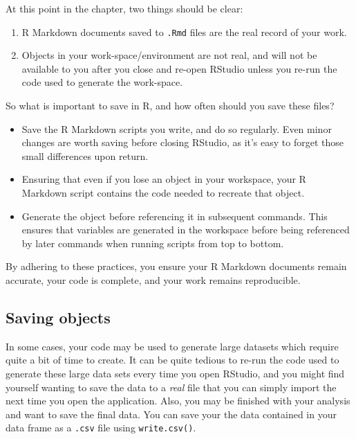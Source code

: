 \documentclass[
]{book}
\providecommand{\tightlist}{%
  \setlength{\itemsep}{0pt}\setlength{\parskip}{0pt}}
\begin{document}
At this point in the chapter, two things should be clear:

\begin{enumerate}
\def\labelenumi{\arabic{enumi}.}
\tightlist
\item
  R Markdown documents saved to \texttt{.Rmd} files are the real record of your work.
\item
  Objects in your work-space/environment are not real, and will not be available to you after you close and re-open RStudio unless you re-run the code used to generate the work-space.
\end{enumerate}

So what is important to save in R, and how often should you save these files?

\begin{itemize}
\tightlist
\item
  Save the R Markdown scripts you write, and do so regularly. Even minor changes are worth saving before closing RStudio, as it's easy to forget those small differences upon return.
\item
  Ensuring that even if you lose an object in your workspace, your R Markdown script contains the code needed to recreate that object.
\item
  Generate the object before referencing it in subsequent commands. This ensures that variables are generated in the workspace before being referenced by later commands when running scripts from top to bottom.
\end{itemize}

By adhering to these practices, you ensure your R Markdown documents remain accurate, your code is complete, and your work remains reproducible.

\hypertarget{saving-objects}{%
\subsection{Saving objects}\label{saving-objects}}

In some cases, your code may be used to generate large datasets which require quite a bit of time to create. It can be quite tedious to re-run the code used to generate these large data sets every time you open RStudio, and you might find yourself wanting to save the data to a \emph{real} file that you can simply import the next time you open the application. Also, you may be finished with your analysis and want to save the final data. You can save your the data contained in your data frame as a \texttt{.csv} file using \texttt{write.csv()}.
\end{document}
